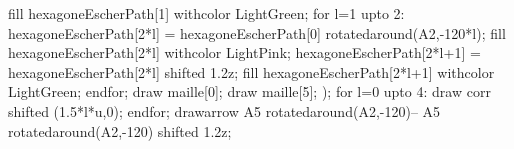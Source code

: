 \begin{corrige}
\begin{enumerate}
\begin{Geometrie}[CoinHD={(9u,4u)}]
            fill hexagoneEscherPath[1] withcolor LightGreen;
            for l=1 upto 2:
                    hexagoneEscherPath[2*l] = hexagoneEscherPath[0] rotatedaround(A2,-120*l);
                fill hexagoneEscherPath[2*l] withcolor LightPink;
                hexagoneEscherPath[2*l+1] = hexagoneEscherPath[2*l] shifted 1.2z;
                fill hexagoneEscherPath[2*l+1] withcolor LightGreen;
            endfor;
            draw maille[0];
            draw maille[5];
            );
            for l=0 upto 4:
                draw corr shifted (1.5*l*u,0);
            endfor;  
            drawarrow A5 rotatedaround(A2,-120)-- A5 rotatedaround(A2,-120) shifted 1.2z;
        \end{Geometrie}
    \end{enumerate}
\end{corrige}

